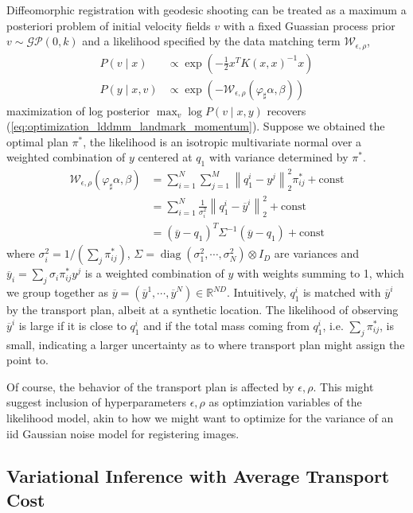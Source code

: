 \documentclass{6838publ}
\newcommand\sG{\ensuremath{\mathcal{G}}}
\newcommand\sP{\ensuremath{\mathcal{P}}}
\newcommand\sW{\ensuremath{\mathcal{W}}}
\newcommand\R{\ensuremath{\mathbb{R}}} %
\newcommand{\norm}[1]{\left\lVert#1\right\rVert}
\DeclareMathOperator*{\diag}{diag} %
\begin{document}
Diffeomorphic registration with geodesic shooting can be treated as a maximum a posteriori problem of initial velocity fields $v$ with a fixed Guassian process prior $v \sim \sG\sP(0,k)$ and a likelihood specified by the data matching term $\sW_{\epsilon,\rho}$,
\begin{align}
    P(v\mid x)
        &\propto \exp(-\frac{1}{2} x^TK(x,x)^{-1}x) \\
    P(y\mid x, v)
        &\propto \exp(-\sW_{\epsilon,\rho}(\varphi_\sharp \alpha, \beta))
    \label{eq:registration_prior_and_likelihood}
\end{align}
maximization of log posterior $\max_v \log P(v\mid x,y)$ recovers (\ref{eq:optimization_lddmm_landmark_momentum}). Suppose we obtained the optimal plan $\pi^*$, the likelihood is an isotropic multivariate normal over a weighted combination of $y$ centered at $q_1$ with variance determined by $\pi^*$.
\begin{align}
    \sW_{\epsilon,\rho}(\varphi_\sharp\alpha,\beta)
        &= \sum_{i=1}^N \sum_{j=1}^M \norm{q_1^i - y^j}_2^2 \pi_{ij}^* + \text{const} \\
        &= \sum_{i=1}^N \frac{1}{\sigma^2_i} \norm{q_1^i - \overline{y}^i}_2^2 + \text{const} \\
        &= (\overline{y} - q_1)^T \Sigma^{-1} (\overline{y} - q_1) + \text{const}
\end{align}
where $\sigma_i^2 = 1/(\sum_{j}\pi_{ij}^*)$, $\Sigma = \diag(\sigma_1^2,\cdots,\sigma_N^2)\otimes I_D$ are variances and $\overline{y}_i = \sum_j \sigma_i \pi_{ij}^* y^j$ is a weighted combination of $y$ with weights summing to 1, which we group together as $\overline{y} = (\overline{y}^1,\cdots,\overline{y}^N) \in \R^{ND}$. Intuitively, $q_1^i$ is matched with $\overline{y}^i$ by the transport plan, albeit at a synthetic location. The likelihood of observing $\overline{y}^i$ is large if it is close to $q_1^i$ and if the total mass coming from $q_1^i$, i.e. $\sum_{j}\pi_{ij}^*$, is small, indicating a larger uncertainty as to where transport plan might assign the point to. 

Of course, the behavior of the transport plan is affected by $\epsilon,\rho$. This might suggest inclusion of hyperparameters $\epsilon,\rho$ as optimziation variables of the likelihood model, akin to how we might want to optimize for the variance of an iid Gaussian noise model for registering images.

\subsection{Variational Inference with Average Transport Cost}
\end{document}
